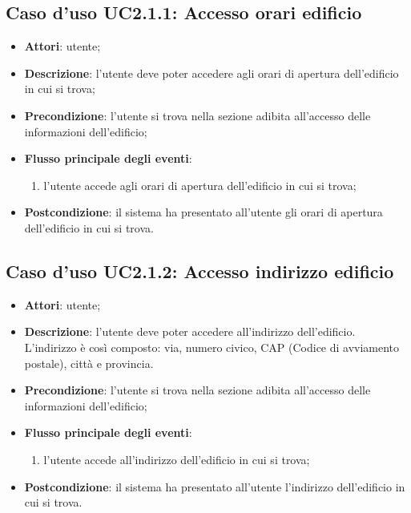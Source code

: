 \documentclass[../AnalisiDeiRequisiti.tex]{subfiles}
\begin{document}
\subsection{Caso d'uso UC2.1.1: Accesso orari edificio}

\begin{itemize}
\item \textbf{Attori}: utente;
\item \textbf{Descrizione}: l'utente deve poter accedere agli orari di apertura dell'edificio in cui si trova; 
      \item \textbf{Precondizione}: l'utente si trova nella sezione adibita all'accesso delle informazioni dell'edificio;

        \item \textbf{Flusso principale degli eventi}:
          \begin{enumerate}
          \item l'utente accede agli orari di apertura dell'edificio in cui si trova;

      \end{enumerate}
    \item \textbf{Postcondizione}: il sistema ha presentato all'utente gli orari di apertura dell'edificio in cui si trova.
  \end{itemize}
\hypertarget{UC2.1.2}{}
\subsection{Caso d'uso UC2.1.2: Accesso indirizzo edificio}

\begin{itemize}
\item \textbf{Attori}: utente;
\item \textbf{Descrizione}: l’utente deve poter accedere all’indirizzo dell’edificio. L’indirizzo è così composto: via, numero civico, CAP (Codice di avviamento postale), città e provincia.
      \item \textbf{Precondizione}: l'utente si trova nella sezione adibita all'accesso delle informazioni dell'edificio;

        \item \textbf{Flusso principale degli eventi}:
          \begin{enumerate}
          \item l'utente accede all'indirizzo dell'edificio in cui si trova;

      \end{enumerate}
    \item \textbf{Postcondizione}: il sistema ha presentato all'utente l'indirizzo dell'edificio in cui si trova.
  \end{itemize}
\hypertarget{UC2.1.3}{}
\end{document}
